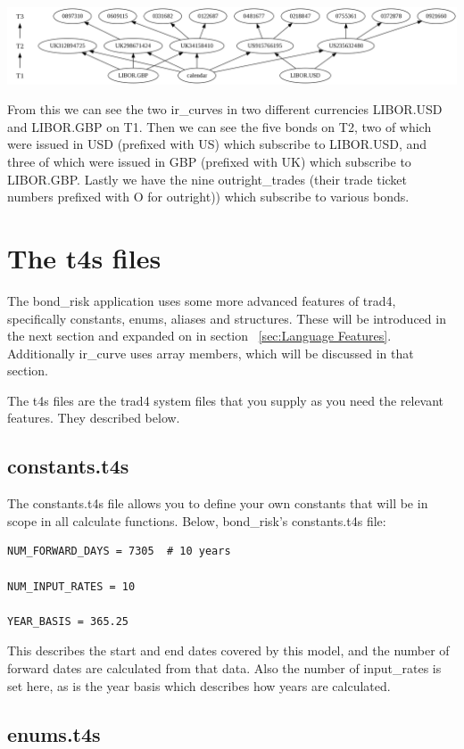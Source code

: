 \documentclass{report}
\begin{document}
\includegraphics[scale=0.25]{bondrisksimpleconcrete.png}

From this we can see the two ir_curves in two different currencies LIBOR.USD and LIBOR.GBP on T1. Then we can see the five bonds on T2, two of which were issued in USD (prefixed with US) which subscribe to LIBOR.USD, and three of which were issued in GBP (prefixed with UK) which subscribe to LIBOR.GBP. Lastly we have the nine outright_trades (their trade ticket numbers prefixed with O for outright)) which subscribe to various bonds.

\section{The t4s files}

The bond_risk application uses some more advanced features of trad4, specifically constants, enums, aliases and structures. These will be introduced in the next section and expanded on in section ~\ref{sec:Language Features}. Additionally ir_curve uses array members, which will be discussed in that section.

The t4s files are the trad4 system files that you supply as you need the relevant features. They described below.

\subsection{constants.t4s}

The constants.t4s file allows you to define your own constants that will be in scope in all calculate functions. Below, bond_risk's constants.t4s file:


\begin{verbatim}
NUM_FORWARD_DAYS = 7305  # 10 years

NUM_INPUT_RATES = 10

YEAR_BASIS = 365.25
\end{verbatim}

This describes the start and end dates covered by this model, and the number of forward dates are calculated from that data. Also the number of input_rates is set here, as is the year basis which describes how years are calculated.

\subsection{enums.t4s}
\end{document}
